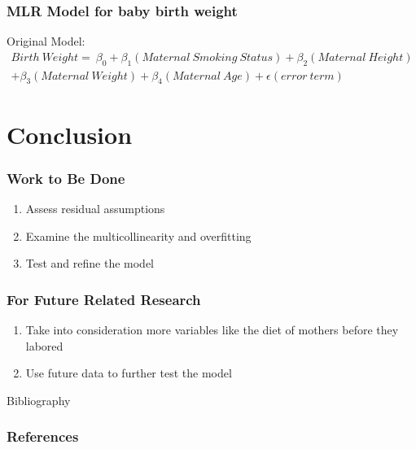 \documentclass[compress,handout,10pt]{beamer}
\let\olditem\item
\renewcommand{\item}{\setlength{\itemsep}{0.5\baselineskip}\olditem}
\begin{document}
\begin{frame}
    \frametitle{MLR Model for baby birth weight}
     Original Model:
\[
\begin{split}
     Birth~Weight=~\beta_0 + \beta_1 (Maternal~Smoking~Status) + \beta_2 (Maternal~Height)\\+ \beta_3(Maternal~Weight) + \beta_4 (Maternal~Age)+ \epsilon(error~term)
\end{split}
\]
\end{frame}

\section{Conclusion}
\begin{frame}
    \frametitle{Work to Be Done}
     \begin{enumerate}
         \item Assess residual assumptions
         \item Examine the multicollinearity and overfitting
         \item Test and refine the model
     \end{enumerate}
\end{frame}

\begin{frame}
    \frametitle{For Future Related Research}
     \begin{enumerate}
         \item Take into consideration more variables like the diet of mothers before they labored
         \item Use future data to further test the model
         
     \end{enumerate}
\end{frame}

\begin{frame}[allowframebreaks]{Bibliography}
    \frametitle{References}
       
       \nocite{*}
      
\end{frame}
\end{document}
